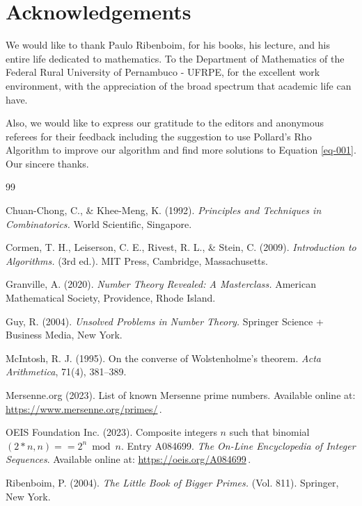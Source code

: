 \documentclass[11pt,a4paper]{article}
\begin{document}
\section*{Acknowledgements} 

We would like to thank Paulo Ribenboim, for his books, his lecture, and his entire life dedicated to mathematics. To the Department of Mathematics of the Federal Rural University of Pernambuco - UFRPE, for the excellent work environment, with the appreciation of the broad spectrum that
academic life can have. 

Also, we would like to express our gratitude to the editors and anonymous referees for their feedback including the suggestion to use Pollard’s Rho Algorithm to improve our algorithm and find more solutions to Equation \eqref{eq-001}. Our sincere thanks.



\makeatletter
\renewcommand{\@biblabel}[1]{[#1]\hfill}
\makeatother
\begin{thebibliography}{99}



 Chuan-Chong, C., \& Khee-Meng, K. (1992). {\it Principles and Techniques in Combinatorics.} World Scientific, Singapore.

 Cormen, T. H., Leiserson, C. E., Rivest, R. L., \& Stein, C.  (2009). {\it Introduction to Algorithms.} (3rd ed.). MIT Press, Cambridge, Massachusetts.

 Granville, A. (2020). {\it Number Theory Revealed: A Masterclass.} American Mathematical Society, Providence, Rhode Island.

 Guy, R. (2004). {\it Unsolved Problems in Number Theory.} Springer Science + Business Media, New York.



 McIntosh, R. J. (1995). {On the converse of Wolstenholme's theorem.} \textit{Acta Arithmetica},  71(4),  381--389.

 Mersenne.org (2023). List of known Mersenne prime numbers. Available online at: \url{https://www.mersenne.org/primes/}\,. %

   OEIS Foundation Inc. (2023). Composite integers $n$ such that binomial $(2*n,n)==2^n \bmod n$.  Entry A084699. \textit{The On-Line Encyclopedia of Integer Sequences}. Available online at: \url{https://oeis.org/A084699}\,. %

 Ribenboim, P. (2004). {\it The Little Book of Bigger Primes.} (Vol. 811). Springer, New York.





\end{thebibliography}
\end{document}
